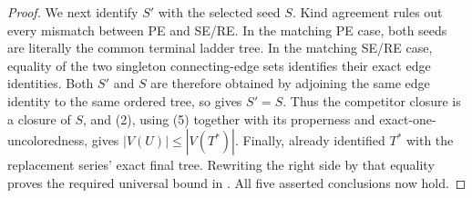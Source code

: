 \begin{proof}
We next identify \(S'\) with the selected seed \(S\).  Kind agreement
rules out every mismatch between PE and SE/RE.  In the matching PE case,
both seeds are literally the common terminal ladder tree.  In the matching
SE/RE case, equality of the two singleton connecting-edge sets identifies
their exact edge identities.  Both \(S'\) and \(S\) are therefore obtained
by adjoining the same edge identity to the same ordered tree, so
 gives \(S'=S\).  Thus the competitor
closure is a closure of \(S\), and (2), using (5) together with its
properness and exact-one-uncoloredness, gives
\(|V(U)|\leq |V(T^*)|\).  Finally,
 already identified \(T^*\) with
the replacement series' exact final tree.  Rewriting the right side by
that equality proves the required universal bound in
.  All five asserted conclusions now hold.
\end{proof}
